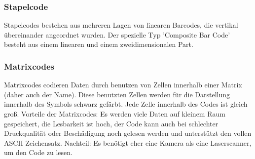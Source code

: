 \subsubsection{Stapelcode}
Stapelcodes bestehen aus mehreren Lagen von linearen Barcodes, die vertikal übereinander angeordnet wurden.
Der spezielle Typ 'Composite Bar Code' besteht aus einem linearen und einem zweidimensionalen Part.

\subsubsection{Matrixcodes}
Matrixcodes codieren Daten durch benutzen von Zellen innerhalb einer Matrix (daher auch der Name). Diese benutzten Zellen werden für die Darstellung innerhalb des Symbols schwarz gefärbt. Jede Zelle innerhalb des Codes ist gleich groß. 
Vorteile der Matrixcodes: Es werden viele Daten auf kleinem Raum gespeichert, die Lesbarkeit ist hoch, der Code kann auch bei schlechter Druckqualität oder Beschädigung noch gelesen werden und unterstützt den vollen ASCII Zeichensatz.
Nachteil: Es benötigt eher eine Kamera als eine Laserscanner, um den Code zu lesen. 


\pagebreak

